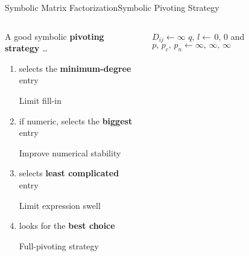 \begin{frame}{Symbolic Matrix Factorization}{Symbolic Pivoting Strategy}
  \vspace{-1.5em}
  \begin{columns}
    \begin{column}[c]{0.47\textwidth}
      A good symbolic \textbf{pivoting strategy} \dots
      \begin{enumerate}
        \item<1> selects the \textbf{minimum-degree} entry \\
        \begin{small}
          \qquad Limit fill-in
        \end{small}
        \item<2> if numeric, selects the \textbf{biggest} entry \\
        \begin{small}
          \qquad Improve numerical stability
        \end{small}
        \item<3> selects \textbf{least complicated} entry \\
        \begin{small}
          \qquad Limit expression swell
        \end{small}
        \item<4> looks for the \textbf{best choice} \\
        \begin{small}
          \qquad Full-pivoting strategy
        \end{small}
      \end{enumerate}
    \end{column}
    \begin{column}[c]{0.53\textwidth}
      \begin{algorithmic}\scriptsize
        \State {}
              \State $D_{ij} \gets \infty$
              {}
            \EndFor
          \EndFor
          \State {}
          \State $q, \, l \gets \, 0, \, 0$  and $p, \, p_c, \, p_n \gets \infty, \, \infty, \, \infty$

\end{algorithmic}
\end{column}
\end{columns}
\end{frame}
